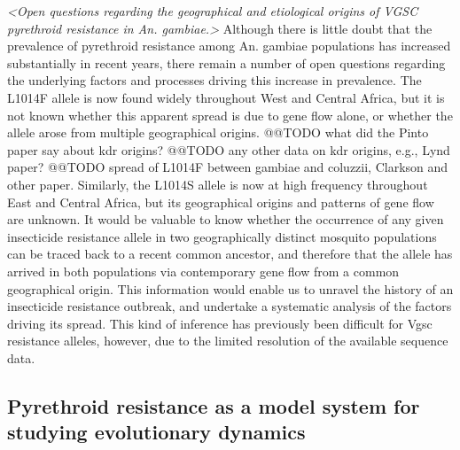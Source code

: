 \documentclass[a4paper,11pt,abstracton,hidelinks]{scrartcl}
\begin{document}
\textit{<Open questions regarding the geographical and etiological origins of VGSC pyrethroid resistance in An. gambiae.>}
%
Although there is little doubt that the prevalence of pyrethroid resistance among An. gambiae populations has increased substantially in recent years, there remain a number of open questions regarding the underlying factors and processes driving this increase in prevalence.
%
The L1014F allele is now found widely throughout West and Central Africa, but it is not known whether this apparent spread is due to gene flow alone, or whether the allele arose from multiple geographical origins.
%
@@TODO what did the Pinto paper say about kdr origins? @@TODO any other data on kdr origins, e.g., Lynd paper?
%
@@TODO spread of L1014F between gambiae and coluzzii, Clarkson and other paper.
%
Similarly, the L1014S allele is now at high frequency throughout East and Central Africa, but its geographical origins and patterns of gene flow are unknown.
%
It would be valuable to know whether the occurrence of any given insecticide resistance allele in two geographically distinct mosquito populations can be traced back to a recent common ancestor, and therefore that the allele has arrived in both populations via contemporary gene flow from a common geographical origin.
%
This information would enable us to unravel the history of an insecticide resistance outbreak, and undertake a systematic analysis of the factors driving its spread.
%
This kind of inference has previously been difficult for Vgsc resistance alleles, however, due to the limited resolution of the available sequence data.


\subsection*{Pyrethroid resistance as a model system for studying evolutionary dynamics}
\end{document}
